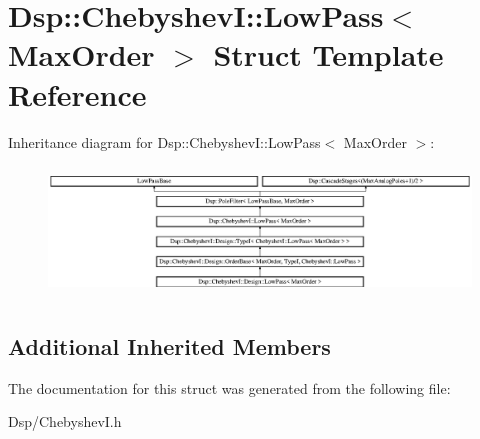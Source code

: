 \hypertarget{structDsp_1_1ChebyshevI_1_1LowPass}{\section{Dsp\-:\-:Chebyshev\-I\-:\-:Low\-Pass$<$ Max\-Order $>$ Struct Template Reference}
\label{structDsp_1_1ChebyshevI_1_1LowPass}
}
Inheritance diagram for Dsp\-:\-:Chebyshev\-I\-:\-:Low\-Pass$<$ Max\-Order $>$\-:\begin{figure}[H]
\begin{center}
\leavevmode
\includegraphics[height=3.485477cm]{structDsp_1_1ChebyshevI_1_1LowPass}
\end{center}
\end{figure}
\subsection*{Additional Inherited Members}


The documentation for this struct was generated from the following file\-:\begin{DoxyCompactItemize}
\item 
Dsp/Chebyshev\-I.\-h\end{DoxyCompactItemize}
